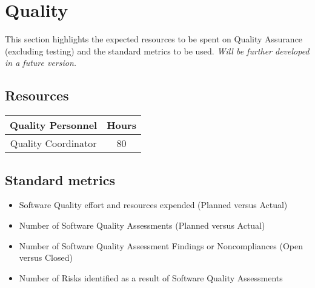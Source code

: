 \section{Quality}
This section highlights the expected resources to be spent on Quality Assurance (excluding testing) and the standard metrics to be used. \emph{Will be further developed in a future version.}

\subsection{Resources}
\begin{table}[H]
\centering
\begin{tabular}{||c c||} 
\hline
Quality Personnel & Hours \\ [0.5ex] 
\hline\hline
Quality Coordinator & 80 \\
\hline
\end{tabular}
\end{table}

\subsection{Standard metrics}
\begin{itemize}
\item Software Quality effort and resources expended (Planned versus Actual)
\item Number of Software Quality Assessments (Planned versus Actual)
\item Number of Software Quality Assessment Findings or Noncompliances (Open versus Closed)
\item Number of Risks identified as a result of Software Quality Assessments
\end{itemize}
